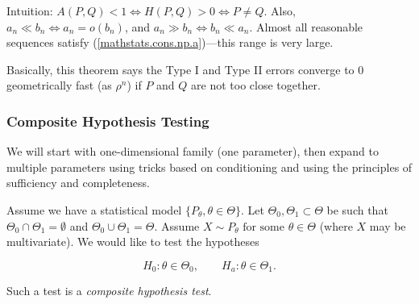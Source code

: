 \begin{remark}

Intuition: \( A(P,Q) < 1 \iff  H(P, Q) > 0 \iff P \neq Q\). Also, \(a_n \ll b_n \iff a_n = o(b_n)\), and \(a_n \gg b_n \iff b_n \ll a_n\). Almost all reasonable sequences satisfy (\ref{mathstats.cons.np.a})---this range is very large. 

Basically, this theorem says the Type I and Type II errors converge to 0 geometrically fast (as \(\rho^n\)) if \(P\) and \(Q\) are not too close together.

\end{remark}

\subsubsection{Composite Hypothesis Testing}




We will start with one-dimensional family (one parameter), then expand to multiple parameters using tricks based on conditioning and using the principles of sufficiency and completeness.

\begin{definition}



Assume we have a statistical model \(\{P_\theta, \theta \in \Theta\}\). Let \(\Theta_0, \Theta_1 \subset \Theta\) be such that \(\Theta_0 \cap \Theta_1 = \emptyset\) and \(\Theta_0 \cup \Theta_1 = \Theta\). Assume \( X \sim P_\theta \text{ for some } \theta \in \Theta\) (where \(X\) may be multivariate). We would like to test the hypotheses

\[
H_0:  \theta \in \Theta_0, \qquad H_a: \theta \in \Theta_1.
\]

Such a test is a \textit{composite hypothesis test}.

\end{definition}

